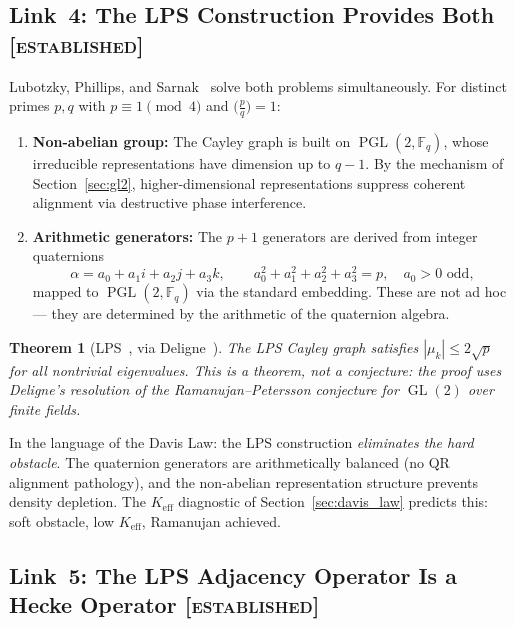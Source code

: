 \documentclass[12pt,reqno]{amsart}
\theoremstyle{plain}
\newtheorem{theorem}{Theorem}[section]
\theoremstyle{definition}
\theoremstyle{remark}
\DeclareMathOperator{\GL}{GL}
\DeclareMathOperator{\PGL}{PGL}
\newcommand{\FF}{\mathbb{F}}
\begin{document}
\subsection{Link~4: The LPS Construction Provides Both
  \textnormal{[\textsc{established}]}}

Lubotzky, Phillips, and Sarnak~\cite{lps1988} solve both problems
simultaneously.  For distinct primes $p, q$ with $p \equiv 1
\pmod{4}$ and $\bigl(\frac{p}{q}\bigr) = 1$:

\begin{enumerate}[nosep]
  \item \textbf{Non-abelian group:} The Cayley graph is built on
    $\PGL(2, \FF_q)$, whose irreducible representations have dimension
    up to $q-1$.  By the mechanism of
    Section~\ref{sec:gl2}, higher-dimensional representations
    suppress coherent alignment via destructive phase interference.
  \item \textbf{Arithmetic generators:} The $p+1$ generators are
    derived from integer quaternions
    \begin{equation}\label{eq:quaternion}
      \alpha = a_0 + a_1 i + a_2 j + a_3 k, \qquad
      a_0^2 + a_1^2 + a_2^2 + a_3^2 = p,
      \quad a_0 > 0 \text{ odd},
    \end{equation}
    mapped to $\PGL(2, \FF_q)$ via the standard embedding.  These are
    not ad hoc --- they are determined by the arithmetic of the
    quaternion algebra.
\end{enumerate}

\begin{theorem}[LPS~\cite{lps1988}, via Deligne~\cite{deligne1974}]
\label{thm:lps}
  The LPS Cayley graph satisfies $|\mu_k| \leq 2\sqrt{p}$ for all
  nontrivial eigenvalues.  This is a theorem, not a conjecture: the
  proof uses Deligne's resolution of the Ramanujan--Petersson
  conjecture for $\GL(2)$ over finite fields.
\end{theorem}

In the language of the Davis Law: the LPS construction
\emph{eliminates the hard obstacle}.  The quaternion generators are
arithmetically balanced (no QR alignment pathology), and the
non-abelian representation structure prevents density depletion.
The $K_{\mathrm{eff}}$ diagnostic of Section~\ref{sec:davis_law}
predicts this: soft obstacle, low $K_{\mathrm{eff}}$, Ramanujan
achieved.

\subsection{Link~5: The LPS Adjacency Operator Is a Hecke Operator
  \textnormal{[\textsc{established}]}}
\end{document}
